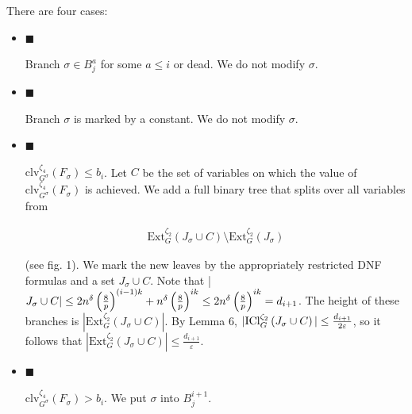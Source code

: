 There are four cases:\par


\begin{itemize}


\item[] 
$\blacksquare$ 


Branch $\sigma\in B^{a}_{j}$ for some $a\leq i$ or dead. We do not modify $\sigma$.\par





\item[] 
$\blacksquare$ 


Branch $\sigma$ is marked by a constant. We do not modify $\sigma$.\par





\item[] 
$\blacksquare$ 


$\mathrm{clv}_{G^{\sigma}}^{\zeta_{4}}\left(F_{\sigma}\right)\leq b_{i}$. Let $C$ be the set of variables on
which the value of $\mathrm{clv}_{G^{\sigma}}^{\zeta_{4}}\left(F_{\sigma}\right)$
is achieved. We add a full binary tree that splits
over all variables from\par


\[\begin{gathered}
\mathrm{Ext}_{G}^{\zeta_{2}}\left(J_{\sigma}\cup C\right)\setminus\mathrm{Ext}%
_{G}^{\zeta_{2}}\left(J_{\sigma}\right)
\end{gathered}\]


(see fig. 1). We mark the new leaves by the appropriately restricted DNF formulas and a set $J_{\sigma}\cup C$. Note that |$J_{\sigma}\cup C|\leq 2n^{\delta}\left(\frac{8}{p}\right)^{(i-1)k}+n^{\delta}%
\left(\frac{8}{p}\right)^{ik}\leq 2n^{\delta}\left(\frac{8}{p}\right)^{ik}=d_{%
i+1}$. The height of these branches is $|\mathrm{Ext}_{G}^{\zeta_{2}}\left(J_{\sigma}\cup C\right)|$. By Lemma 6, $|\mathrm{ICl}_{G}^{\zeta_{2}}\left(J_{\sigma}\cup C\right)|\leq\frac{d_{i+1}}{%
2\varepsilon}$, so it follows that $|\mathrm{Ext}_{G}^{\zeta_{2}}\left(J_{\sigma}\cup C\right)|\leq\frac{d_{i+1}}{\varepsilon}$.\par





\item[] 
$\blacksquare$ 


$\mathrm{clv}_{G^{\sigma}}^{\zeta_{4}}\left(F_{\sigma}\right)>b_{i}$. We put $\sigma$ into $B^{i+1}_{j}$.\par





\end{itemize}




